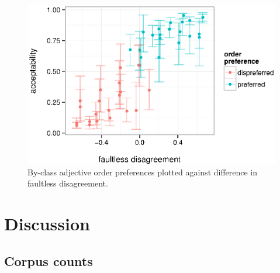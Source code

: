 \documentclass{pnastwo}
\begin{document}
\begin{article}
\begin{figure}[h]
	\centering
	\includegraphics[width=.95\linewidth]{plots/faultless_order_preference.eps}
	\caption{By-class adjective order preferences plotted against difference in faultless disagreement.}\label{faultless-order}
\end{figure}

\section{Discussion}



\begin{materials}
\section{Corpus counts} 


\end{materials}
\end{article}
\end{document}

